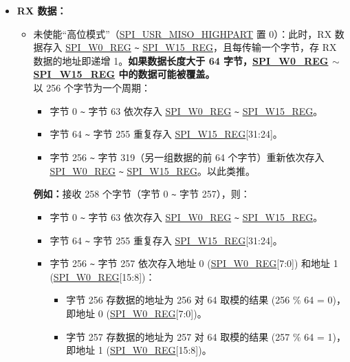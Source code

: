 \documentclass[main\_\_CN.tex]{subfiles}
\begin{document}
\begin{itemize}
\begin{itemize}
    \end{itemize}
    \item \textbf{RX 数据：}
    \begin{itemize}
        \item 未使能“高位模式”（\hyperref[fielddesc:SPIUSRMISOHIGHPART]{SPI\_USR\_MISO\_HIGHPART} 置 0）：此时，RX 数据存入 \hyperref[regdesc:SPIW0REG]{SPI\_W0\_REG} \verb+~+ \hyperref[regdesc:SPIW15REG]{SPI\_W15\_REG}，且每传输一个字节，存 RX 数据的地址即递增 1。\textbf{如果数据长度大于 64 字节，\hyperref[regdesc:SPIW0REG]{SPI\_W0\_REG} $\sim$ \hyperref[regdesc:SPIW15REG]{SPI\_W15\_REG} 中的数据可能被覆盖。}\\
        以 256 个字节为一个周期：
        \begin{itemize}
            \item 字节 0 \verb+~+ 字节 63 依次存入 \hyperref[regdesc:SPIW0REG]{SPI\_W0\_REG} \verb+~+ \hyperref[regdesc:SPIW15REG]{SPI\_W15\_REG}。
            \item 字节 64 \verb+~+ 字节 255 重复存入 \hyperref[regdesc:SPIW15REG]{SPI\_W15\_REG}[31:24]。
            \item 字节 256 \verb+~+ 字节 319（另一组数据的前 64 个字节）重新依次存入 \hyperref[regdesc:SPIW0REG]{SPI\_W0\_REG} \verb+~+ \hyperref[regdesc:SPIW15REG]{SPI\_W15\_REG}。以此类推。
        \end{itemize}
        \textbf{例如：}接收 258 个字节（字节 0 \verb+~+ 字节 257），则：
        \begin{itemize}
            \item 字节 0 \verb+~+ 字节 63 依次存入 \hyperref[regdesc:SPIW0REG]{SPI\_W0\_REG} \verb+~+ \hyperref[regdesc:SPIW15REG]{SPI\_W15\_REG}。
            \item 字节 64 \verb+~+ 字节 255 重复存入 \hyperref[regdesc:SPIW15REG]{SPI\_W15\_REG}[31:24]。
            \item 字节 256 \verb+~+ 字节 257 依次存入地址 0 (\hyperref[regdesc:SPIW0REG]{SPI\_W0\_REG}[7:0]) 和地址 1 (\hyperref[regdesc:SPIW0REG]{SPI\_W0\_REG}[15:8])：
            \begin{itemize}
                \item 字节 256 存数据的地址为 256 对 64 取模的结果 (256 \% 64 = 0)，即地址 0 (\hyperref[regdesc:SPIW0REG]{SPI\_W0\_REG}[7:0])。
                \item 字节 257 存数据的地址为 257 对 64 取模的结果 (257 \% 64 = 1)，即地址 1 (\hyperref[regdesc:SPIW0REG]{SPI\_W0\_REG}[15:8])。
            \end{itemize}
        \end{itemize}

\end{itemize}
\end{itemize}
\end{document}
